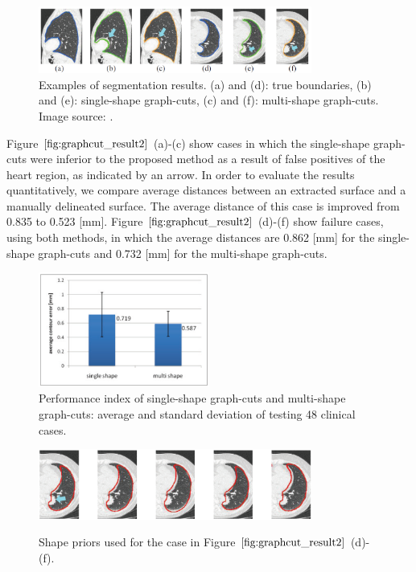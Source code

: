 \documentclass{SMBV12}
\begin{document}
\begin{figure}[htbp]
    \centering
    \includegraphics[width=0.8\textwidth]{images/graphcut_result2.png}
    \caption{Examples of segmentation results. (a) and (d): true boundaries, (b) and (e): single-shape
    graph-cuts, (c) and (f): multi-shape graph-cuts. Image source: \cite{nakagomimulti}.}
    \label{fig:graphcut_result2}
\end{figure}

Figure $\ref{fig:graphcut_result2}$ (a)-(c) show cases in which the single-shape graph-cuts were inferior to the proposed method as a result of false positives of the heart region, as indicated by an arrow. In order to
evaluate the results quantitatively, we compare average distances between an extracted surface and a manually delineated surface. The average distance of this case is improved from 0.835 to 0.523 [mm]. Figure $\ref{fig:graphcut_result2}$ (d)-(f) show failure cases, using both methods, in which the average distances are 0.862 [mm] for the single-shape graph-cuts and 0.732 [mm] for the multi-shape graph-cuts.

\begin{figure}[htbp]
\centering
\includegraphics[width=0.5\textwidth]{images/multi_shape_vs_single.png}
\caption{Performance index of single-shape graph-cuts and multi-shape graph-cuts: average and standard deviation of testing 48 clinical cases.}
\label{fig:multi_shape_std}
\end{figure}

\begin{figure}[htbp]
\centering
\includegraphics[width=0.8\textwidth]{images/shape_priors.png}
\label{fig:shape_priors}
\caption{Shape priors used for the case in Figure $\ref{fig:graphcut_result2}$ (d)-(f).}
\end{figure}
\end{document}
